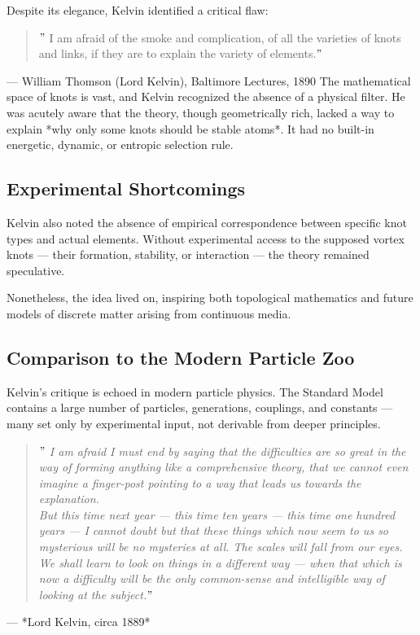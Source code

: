    Despite its elegance, Kelvin identified a critical flaw:

   \begin{quote}
   \("\) I am afraid of the smoke and complication, of all the varieties of knots and links, if they are to explain the variety of elements.\("\)
   \end{quote}
    \hfill — William Thomson (Lord Kelvin), Baltimore Lectures, 1890
   The mathematical space of knots is vast, and Kelvin recognized the absence of a physical filter. He was acutely aware that the theory, though geometrically rich, lacked a way to explain *why only some knots should be stable atoms*. It had no built-in energetic, dynamic, or entropic selection rule.

   \subsection*{Experimental Shortcomings}

   Kelvin also noted the absence of empirical correspondence between specific knot types and actual elements. Without experimental access to the supposed vortex knots — their formation, stability, or interaction — the theory remained speculative.

   Nonetheless, the idea lived on, inspiring both topological mathematics and future models of discrete matter arising from continuous media.

   \subsection*{Comparison to the Modern Particle Zoo}

   Kelvin's critique is echoed in modern particle physics. The Standard Model contains a large number of particles, generations, couplings, and constants — many set only by experimental input, not derivable from deeper principles.

   \begin{quote}
   \textit{\("\) I am afraid I must end by saying that the difficulties are so great in the way of forming anything like a comprehensive theory, that we cannot even imagine a finger-post pointing to a way that leads us towards the explanation.} \\
   \textit{But this time next year — this time ten years — this time one hundred years — I cannot doubt but that these things which now seem to us so mysterious will be no mysteries at all. The scales will fall from our eyes. We shall learn to look on things in a different way — when that which is now a difficulty will be the only common-sense and intelligible way of looking at the subject.\("\)}
   \end{quote}
   \begin{flushright}
      — *Lord Kelvin, circa 1889*
   \end{flushright}


